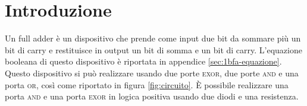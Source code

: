 \section{Introduzione}\label{sec:textscopo}
Un full adder è un dispositivo che prende come input due bit da sommare più un bit di carry e restituisce in output
un bit di somma e un bit di carry.
L'equazione booleana di questo dispositivo è riportata in appendice \ref{sec:1bfa-equazione}.
Questo dispositivo si può realizzare usando due porte \textsc{exor}, due porte \textsc{and} e una porta \textsc{or}, così come
riportato in figura \ref{fig:circuito}.
È possibile realizzare una porta \textsc{and} e una porta \textsc{exor} in logica positiva usando due diodi e una
resistenza.

